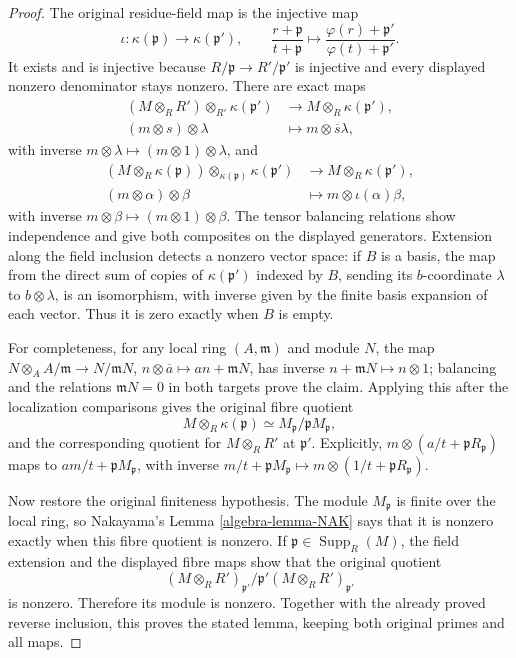 \begin{proof}
The original residue-field map is the injective map
$$
\iota:\kappa(\mathfrak p)\longrightarrow\kappa(\mathfrak p'),
\qquad
\frac{r+\mathfrak p}{t+\mathfrak p}
\longmapsto
\frac{\varphi(r)+\mathfrak p'}{\varphi(t)+\mathfrak p'}.
$$
It exists and is injective because $R/\mathfrak p\to
R'/\mathfrak p'$ is injective and every displayed
nonzero denominator stays nonzero. There are exact maps
\[
\begin{split}
(M\otimes_RR')\otimes_{R'}\kappa(\mathfrak p')
&\longrightarrow M\otimes_R\kappa(\mathfrak p'),\\
(m\otimes s)\otimes\lambda
&\longmapsto m\otimes\overline s\lambda,
\end{split}
\]
with inverse $m\otimes\lambda\mapsto(m\otimes1)\otimes\lambda$,
and
\[
\begin{split}
(M\otimes_R\kappa(\mathfrak p))
\otimes_{\kappa(\mathfrak p)}\kappa(\mathfrak p')
&\longrightarrow M\otimes_R\kappa(\mathfrak p'),\\
(m\otimes\alpha)\otimes\beta
&\longmapsto m\otimes\iota(\alpha)\beta,
\end{split}
\]
with inverse $m\otimes\beta\mapsto(m\otimes1)\otimes\beta$.
The tensor balancing relations show independence and give
both composites on the displayed generators. Extension
along the field inclusion detects a nonzero vector space:
if $B$ is a basis, the map from the direct sum of copies
of $\kappa(\mathfrak p')$ indexed by $B$, sending its
$b$-coordinate $\lambda$ to $b\otimes\lambda$, is an
isomorphism, with inverse given by the finite basis
expansion of each vector. Thus it is zero exactly when
$B$ is empty.

For completeness, for any local ring $(A,\mathfrak m)$
and module $N$, the map
$N\otimes_A A/\mathfrak m\to N/\mathfrak mN$,
$n\otimes\overline a\mapsto an+\mathfrak mN$, has inverse
$n+\mathfrak mN\mapsto n\otimes1$; balancing and the
relations $\mathfrak mN=0$ in both targets prove the claim.
Applying this after the localization comparisons gives the
original fibre quotient
$$
M\otimes_R\kappa(\mathfrak p)
\simeq M_{\mathfrak p}/\mathfrak pM_{\mathfrak p},
$$
and the corresponding quotient for $M\otimes_RR'$ at
$\mathfrak p'$. Explicitly,
$m\otimes(a/t+\mathfrak pR_{\mathfrak p})$ maps to
$am/t+\mathfrak pM_{\mathfrak p}$, with inverse
$m/t+\mathfrak pM_{\mathfrak p}\mapsto
m\otimes(1/t+\mathfrak pR_{\mathfrak p})$.

Now restore the original finiteness hypothesis. The module
$M_{\mathfrak p}$ is finite over the local ring, so
Nakayama's Lemma \ref{algebra-lemma-NAK} says that it is nonzero
exactly when this fibre quotient is nonzero. If
$\mathfrak p\in\operatorname{Supp}_R(M)$, the field
extension and the displayed fibre maps show that the
original quotient
$$
(M\otimes_RR')_{\mathfrak p'}/
\mathfrak p'(M\otimes_RR')_{\mathfrak p'}
$$
is nonzero. Therefore its module is nonzero. Together
with the already proved reverse inclusion, this proves
the stated lemma, keeping both original primes and all maps.


\end{proof}
